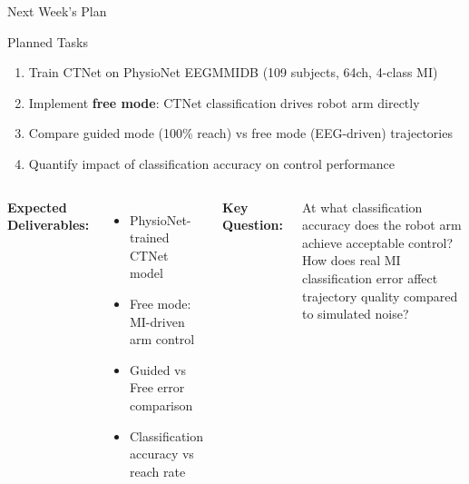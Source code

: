 \documentclass[aspectratio=169, 11pt]{beamer}
\begin{document}
\begin{frame}{Next Week's Plan}
    \begin{block}{Planned Tasks}
        \begin{enumerate}
            \item Train CTNet on PhysioNet EEGMMIDB (109 subjects, 64ch, 4-class MI)
            \item Implement \textbf{free mode}: CTNet classification drives robot arm directly
            \item Compare guided mode (100\% reach) vs free mode (EEG-driven) trajectories
            \item Quantify impact of classification accuracy on control performance
        \end{enumerate}
    \end{block}
    
    \vspace{3mm}
    
    \begin{columns}[T]
        \textbf{Expected Deliverables:}
        \begin{itemize}
            \item PhysioNet-trained CTNet model
            \item Free mode: MI-driven arm control
            \item Guided vs Free error comparison
            \item Classification accuracy vs reach rate
        \end{itemize}
        
        \textbf{Key Question:}
        \begin{alertblock}{}
            \footnotesize
            At what classification accuracy does the robot arm achieve acceptable control? How does real MI classification error affect trajectory quality compared to simulated noise?
        \end{alertblock}
    \end{columns}
\end{frame}
\end{document}

